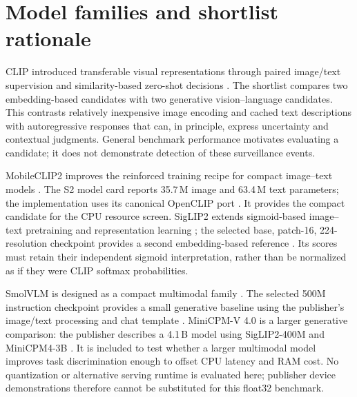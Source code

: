 \documentclass[11pt,a4paper]{article}
\begin{document}
\section{Model families and shortlist rationale}
CLIP introduced transferable visual representations through paired image/text supervision and similarity-based zero-shot decisions \cite{clip}. The shortlist compares two embedding-based candidates with two generative vision--language candidates. This contrasts relatively inexpensive image encoding and cached text descriptions with autoregressive responses that can, in principle, express uncertainty and contextual judgments. General benchmark performance motivates evaluating a candidate; it does not demonstrate detection of these surveillance events.

MobileCLIP2 improves the reinforced training recipe for compact image--text models \cite{mobilepaper}. The S2 model card reports 35.7\,M image and 63.4\,M text parameters; the implementation uses its canonical OpenCLIP port \cite{mobilecard}. It provides the compact candidate for the CPU resource screen. SigLIP2 extends sigmoid-based image--text pretraining and representation learning \cite{siglippaper,siglip2paper}; the selected base, patch-16, 224-resolution checkpoint provides a second embedding-based reference \cite{siglipcard}. Its scores must retain their independent sigmoid interpretation, rather than be normalized as if they were CLIP softmax probabilities.

SmolVLM is designed as a compact multimodal family \cite{smolpaper}. The selected 500M instruction checkpoint provides a small generative baseline using the publisher's image/text processing and chat template \cite{smolcard}. MiniCPM-V 4.0 is a larger generative comparison: the publisher describes a 4.1\,B model using SigLIP2-400M and MiniCPM4-3B \cite{minicard}. It is included to test whether a larger multimodal model improves task discrimination enough to offset CPU latency and RAM cost. No quantization or alternative serving runtime is evaluated here; publisher device demonstrations therefore cannot be substituted for this float32 benchmark.
\end{document}
